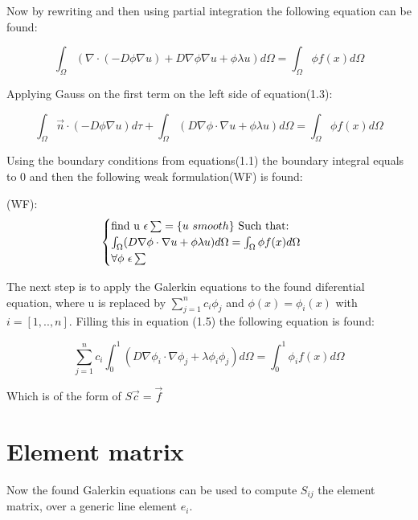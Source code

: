 \documentclass{report}
\begin{document}
Now by rewriting and then using partial integration the following equation can be found:


\begin{equation}
	\int_{\Omega} (\nabla\cdot(-D\phi\nabla u) + D\nabla\phi\nabla u +\phi \lambda u) d\Omega = \int_{\Omega} \phi f(x) d\Omega 
\end{equation}
\smallskip

Applying Gauss on the first term on the left side of equation(1.3):


\begin{equation}
	\int_{\Omega}  \vec{n}\cdot(-D\phi \nabla u) d\tau + \int_{\Omega}  (D\nabla\phi\cdot\nabla u +\phi\lambda u )d\Omega = \int_{\Omega} \phi f(x) d\Omega 
\end{equation}
\smallskip

Using the boundary conditions from equations(1.1) the boundary integral equals to 0 and then the following weak formulation(WF) is found: \vspace{5mm}


(WF): \begin{equation}
\begin{cases} 
	$find u $\epsilon \sum =\{u$ $ smooth\}$ Such that:$ \\ \int_{\Omega}  (D\nabla\phi\cdot\nabla u +\phi\lambda u )d\Omega = \int_{\Omega} \phi f(x) d\Omega \\ \forall\phi $ $ \epsilon\sum 
\end{cases}\  
\end{equation}

\bigskip
The next step is to apply the Galerkin equations to the found diferential equation, where u is replaced by $ \sum_{j=1}^{n}c_i\phi_j $ and  $\phi(x)=\phi_i(x)$ with $i = [1,..,n]$. Filling this in equation (1.5) the following equation is found:

\begin{equation}
	\sum_{j=1}^{n}c_i\int_{0}^{1} (D\nabla\phi_i\cdot\nabla\phi_j +\lambda\phi_i\phi_j )d\Omega = \int_{0}^{1} \phi_i f(x) d\Omega
\end{equation}
\medskip

Which is of the form of $ S\vec{c} = \vec{f} $

\section{Element matrix}
Now the found Galerkin equations can be used to compute $ S_{ij}$  the element matrix, over a generic line element $ e_i$.
\end{document}
